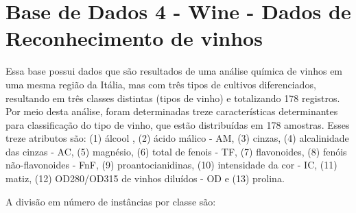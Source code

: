 % 
% 



\section{Base de Dados 4 - Wine - Dados de Reconhecimento de vinhos}

 

Essa base \cite{Aeberhard1992} possui dados que são resultados de uma análise química de vinhos em uma mesma região da Itália, mas com três tipos de cultivos diferenciados, resultando em três classes distintas (tipos de vinho) e totalizando 178 registros. Por meio desta análise, foram determinadas treze características determinantes para classificação do tipo de vinho, que estão distribuídas em 178 amostras. Esses treze atributos são: (1) álcool , (2) ácido málico - AM, (3) cinzas, (4) alcalinidade das cinzas - AC, (5) magnésio, (6) total de fenois - TF, (7) flavonoides, (8) fenóis não-flavonoides - FnF, (9) proantocianidinas, (10) intensidade da cor - IC, (11) matiz, (12) OD280/OD315 de vinhos diluídos - OD e (13) prolina. 

A divisão em número de instâncias por classe são:

